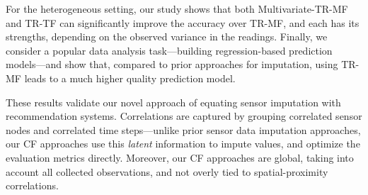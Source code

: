 For the heterogeneous setting, our study shows that both
Multivariate-TR-MF and TR-TF can significantly improve the accuracy over TR-MF,
and each has its strengths, depending on the observed variance in the
readings.  Finally, we consider a popular data analysis task---building regression-based prediction models---and show that,
compared to prior approaches for imputation, using TR-MF leads to a much higher quality prediction model.

These results validate our novel approach of equating sensor imputation with recommendation systems.  
Correlations are captured by grouping correlated sensor nodes and correlated time
steps---unlike prior sensor data imputation approaches, our CF
approaches use this {\em latent} information to impute values, and optimize the evaluation metrics directly. 
Moreover, our CF approaches are global, taking into account all
collected observations, and not overly tied to spatial-proximity
correlations.  


